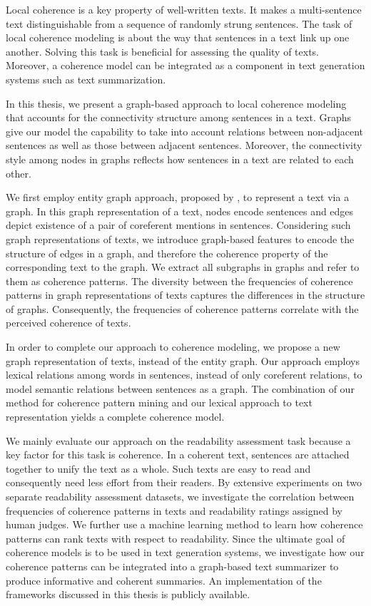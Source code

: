 \addchap*{\abstractname}

Local coherence is a key property of well-written texts. It makes a multi-sentence text distinguishable from a sequence of randomly strung sentences. 
The task of local coherence modeling is about the way that sentences in a text link up one another.  
Solving this task is beneficial for assessing the quality of texts. 
Moreover, a coherence model can be integrated as a component in text generation systems such as text summarization. 

In this thesis, we present a graph-based approach to local coherence modeling that accounts for the connectivity structure among sentences in a text. 
Graphs give our model the capability to take into account relations between non-adjacent sentences as well as those between adjacent sentences. 
Moreover, the connectivity style among nodes in graphs reflects how sentences in a text are related to each other. 

We first employ entity graph approach, proposed by , to represent a text via a graph. 
In this graph representation of a text, nodes encode sentences and edges depict existence of a pair of coreferent mentions in sentences.    
Considering such graph representations of texts, we introduce graph-based features to encode the structure of edges in a graph, and therefore the coherence property of the corresponding text to the graph.   
We extract all subgraphs in graphs and refer to them as coherence patterns. 
The diversity between the frequencies of coherence patterns in graph representations of texts captures the differences in the structure of graphs.  
Consequently, the frequencies of coherence patterns correlate with the perceived coherence of texts.  

In order to complete our approach to coherence modeling, we propose a new graph representation of texts, instead of the entity graph.  
Our approach employs lexical relations among words in sentences, instead of only coreferent relations, to model semantic relations between sentences as a graph. 
The combination of our method for coherence pattern mining and our lexical approach to text representation yields a complete coherence model. 

We mainly evaluate our approach on the readability assessment task because a key factor for this task is coherence. 
In a coherent text, sentences are attached together to unify the text as a whole. 
Such texts are easy to read and consequently need less effort from their readers. 
By extensive experiments on two separate readability assessment datasets, 
we investigate the correlation between frequencies of coherence patterns in texts and readability ratings assigned by human judges.    
We further use a machine learning method to learn how coherence patterns can rank texts with respect to readability. 
Since the ultimate goal of coherence models is to be used in text generation systems, we investigate how our coherence patterns can be integrated into a graph-based text summarizer to produce informative and coherent summaries. 
An implementation of the frameworks discussed in this thesis is publicly available.

